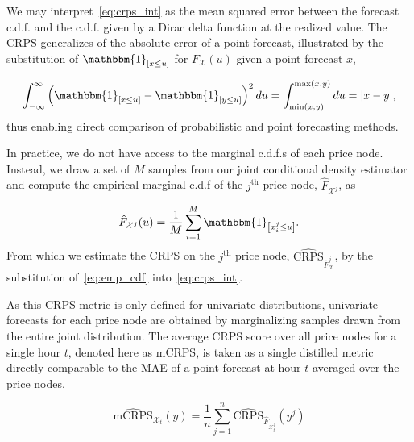 We may interpret~\eqref{eq:crps_int} as the mean squared error between the forecast c.d.f. and the c.d.f. given by a
Dirac delta function at the realized value.
The CRPS generalizes of the absolute error of a point forecast, illustrated by the substitution of
$\mathbbm{1}_{\left[ x \leq u\right]}$ for $F_\mathcal{X}(u)$ given a point forecast $x$,

\begin{equation*}
    \int_{-\infty}^{\infty} \left(\mathbbm{1}_{\left[ x \leq u\right]} - \mathbbm{1}_{\left[ y \leq u \right]}\right)^2 du =
    \int_{\min(x, y)}^{\max(x, y)} du = |x - y|,
\end{equation*}
thus enabling direct comparison of probabilistic and point forecasting methods.

In practice, we do not have access to the marginal c.d.f.s of each price node.
Instead, we draw a set of $M$ samples from our joint conditional density estimator and compute the empirical marginal
c.d.f of the $j^{\text{th}}$ price node, $\hat{F}_{\mathcal{X}^j}$, as

\begin{equation}
    \hat{F}_{\mathcal{X}^j}(u) = \frac{1}{M} \sum_{i=1}^M \mathbbm{1}_{\left[ x_i^j \leq u \right]}
    \label{eq:emp_cdf}.
\end{equation}
From which we estimate the CRPS on the $j^{\text{th}}$ price node, $\widehat{\text{CRPS}}_{\hat{F}_\mathcal{X}^j}$, by
the substitution of~\eqref{eq:emp_cdf} into~\eqref{eq:crps_int}\footnotemark.


As this CRPS metric is only defined for univariate distributions, univariate forecasts for each price node are obtained
by marginalizing samples drawn from the entire joint distribution.
The average CRPS score over all price nodes for a single hour $t$, denoted here as mCRPS, is taken as a
single distilled metric directly comparable to the MAE of a point forecast at hour $t$ averaged over the price nodes.

\begin{equation}
    \widehat{\text{mCRPS}}_{\mathcal{X}_t}(y) = \frac{1}{n} \sum_{j=1}^n \widehat{\text{CRPS}}_{\hat{F}_{\mathcal{X}^j_t}}(y^j)
    \label{eq:mcrps}
\end{equation}

